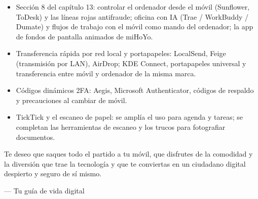 
\begin{itemize}
  \item Sección 8 del capítulo 13: controlar el ordenador desde el móvil (Sunflower, ToDesk) y las líneas rojas antifraude; oficina con IA (Trae / WorkBuddy / Dumate) y flujos de trabajo con el móvil como mando del ordenador; la app de fondos de pantalla animados de miHoYo.
  \item Transferencia rápida por red local y portapapeles: LocalSend, Feige (transmisión por LAN), AirDrop; KDE Connect, portapapeles universal y transferencia entre móvil y ordenador de la misma marca.
  \item Códigos dinámicos 2FA: Aegis, Microsoft Authenticator, códigos de respaldo y precauciones al cambiar de móvil.
  \item TickTick y el escaneo de papel: se amplía el uso para agenda y tareas; se completan las herramientas de escaneo y los trucos para fotografiar documentos.
\end{itemize}

Te deseo que saques todo el partido a tu móvil, que disfrutes de la comodidad y la diversión que trae la tecnología y que te conviertas en un ciudadano digital despierto y seguro de sí mismo.

— Tu guía de vida digital
